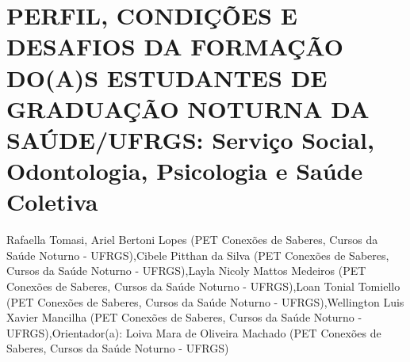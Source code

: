 

\section{PERFIL, CONDIÇÕES E DESAFIOS DA FORMAÇÃO DO(A)S ESTUDANTES DE GRADUAÇÃO NOTURNA DA SAÚDE/UFRGS:  Serviço Social, Odontologia, Psicologia e Saúde Coletiva}

Rafaella Tomasi, Ariel Bertoni Lopes (PET Conexões de Saberes, Cursos da Saúde Noturno - UFRGS),Cibele Pitthan da Silva (PET Conexões de Saberes, Cursos da Saúde Noturno - UFRGS),Layla Nicoly Mattos Medeiros (PET Conexões de Saberes, Cursos da Saúde Noturno - UFRGS),Loan Tonial Tomiello (PET Conexões de Saberes, Cursos da Saúde Noturno - UFRGS),Wellington Luis Xavier Mancilha (PET Conexões de Saberes, Cursos da Saúde Noturno - UFRGS),Orientador(a): Loiva Mara de Oliveira Machado (PET Conexões de Saberes, Cursos da Saúde Noturno - UFRGS)

